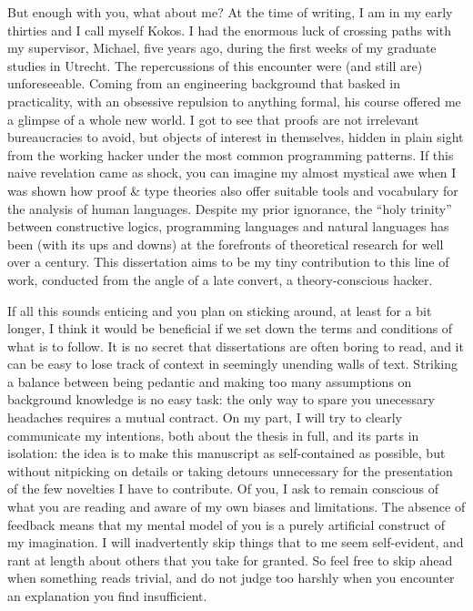 {But enough with you, what about me? 
At the time of writing, I am in my early thirties and I call myself Kokos. 
I had the enormous luck of crossing paths with my supervisor, Michael, five years ago, during the first weeks of my graduate studies in Utrecht. 
The repercussions of this encounter were (and still are) unforeseeable. 
Coming from an engineering background that basked in practicality, with an obsessive repulsion to anything formal, his course offered me a glimpse of a whole new world. 
I got to see that proofs are not irrelevant bureaucracies to avoid, but objects of interest in themselves, hidden in plain sight from the working hacker under the most common programming patterns. 
If this naive revelation came as shock, you can imagine my almost mystical awe when I was shown how proof \& type theories also offer suitable tools and vocabulary for the analysis of human languages. 
Despite my prior ignorance, the “holy trinity” between constructive logics, programming languages and natural languages has been (with its ups and downs) at the forefronts of theoretical research for well over a century. 
This dissertation aims to be my tiny contribution to this line of work, conducted from the angle of a late convert, a theory-conscious hacker. 

If all this sounds enticing and you plan on sticking around, at least for a bit longer, I think it would be beneficial if we set down the terms and conditions of what is to follow. 
It is no secret that dissertations are often boring to read, and it can be easy to lose track of context in seemingly unending walls of text. 
Striking a balance between being pedantic and making too many assumptions on background knowledge is no easy task: the only way to spare you unecessary headaches requires a mutual contract. 
On my part, I will try to clearly communicate my intentions, both about the thesis in full, and its parts in isolation: the idea is to make this manuscript as self-contained as possible, but without nitpicking on details or taking detours unnecessary for the presentation of the few novelties I have to contribute.
Of you, I ask to remain conscious of what you are reading and aware of my own biases and limitations. 
The absence of feedback means that my mental model of you is a purely artificial construct of my imagination.
I will inadvertently skip things that to me seem self-evident, and rant at length about others that you take for granted.
So feel free to skip ahead when something reads trivial, and do not judge too harshly when you encounter an explanation you find insufficient.

}

